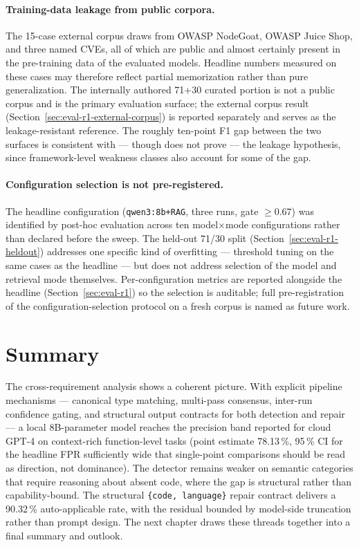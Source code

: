 \paragraph{Training-data leakage from public corpora.}
The 15-case external corpus draws from OWASP NodeGoat, OWASP Juice Shop, and three named CVEs, all of which are public and almost certainly present in the pre-training data of the evaluated models. Headline numbers measured on these cases may therefore reflect partial memorization rather than pure generalization. The internally authored 71+30 curated portion is not a public corpus and is the primary evaluation surface; the external corpus result (Section~\ref{sec:eval-r1-external-corpus}) is reported separately and serves as the leakage-resistant reference. The roughly ten-point F1 gap between the two surfaces is consistent with --- though does not prove --- the leakage hypothesis, since framework-level weakness classes also account for some of the gap.

\paragraph{Configuration selection is not pre-registered.}
The headline configuration (\texttt{qwen3:8b+RAG}, three runs, gate $\geq 0.67$) was identified by post-hoc evaluation across ten model$\times$mode configurations rather than declared before the sweep. The held-out 71/30 split (Section~\ref{sec:eval-r1-heldout}) addresses one specific kind of overfitting --- threshold tuning on the same cases as the headline --- but does not address selection of the model and retrieval mode themselves. Per-configuration metrics are reported alongside the headline (Section~\ref{sec:eval-r1}) so the selection is auditable; full pre-registration of the configuration-selection protocol on a fresh corpus is named as future work.

\section{Summary}

The cross-requirement analysis shows a coherent picture. With explicit pipeline mechanisms --- canonical type matching, multi-pass consensus, inter-run confidence gating, and structural output contracts for both detection and repair --- a local 8B-parameter model reaches the precision band reported for cloud GPT-4 on context-rich function-level tasks (point estimate 78.13\,\%, 95\,\% CI for the headline FPR sufficiently wide that single-point comparisons should be read as direction, not dominance). The detector remains weaker on semantic categories that require reasoning about absent code, where the gap is structural rather than capability-bound. The structural \texttt{\{code, language\}} repair contract delivers a 90.32\,\% auto-applicable rate, with the residual bounded by model-side truncation rather than prompt design. The next chapter draws these threads together into a final summary and outlook.
